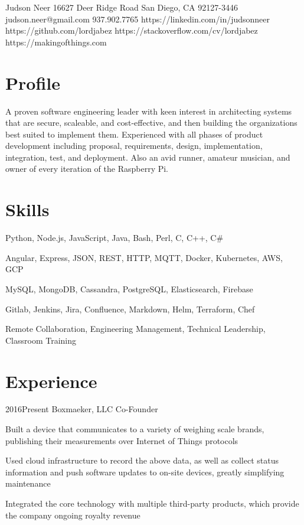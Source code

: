 \documentclass{article}
\begin{document}
\header
  {Judson Neer}
  {16627 Deer Ridge Road}
  {San Diego, CA 92127-3446}
  {judson.neer@gmail.com}
  {937.902.7765}
  {https://linkedin.com/in/judsonneer}
  {https://github.com/lordjabez}
  {https://stackoverflow.com/cv/lordjabez}
  {https://makingofthings.com}


\section{Profile}

A proven software engineering leader with keen interest in architecting systems that are secure, scaleable, and cost-effective, and then building the organizations best suited to implement them. Experienced with all phases of product development including proposal, requirements, design, implementation, integration, test, and deployment. Also an avid runner, amateur musician, and owner of every iteration of the Raspberry Pi.


\section{Skills}

  {Python, Node.js, JavaScript, Java, Bash, Perl, C, C++, C\#}

  {Angular, Express, JSON, REST, HTTP, MQTT, Docker, Kubernetes, AWS, GCP}

  {MySQL, MongoDB, Cassandra, PostgreSQL, Elasticsearch, Firebase}

  {Gitlab, Jenkins, Jira, Confluence, Markdown, Helm, Terraform, Chef}

  {Remote Collaboration, Engineering Management, Technical Leadership, Classroom Training}


\section{Experience}

\job
  {2016}{Present}
  {Boxmaeker, LLC}
  {Co-Founder}
  {\begin{achievements}
    \item Built a device that communicates to a variety of weighing scale brands, publishing their measurements over Internet of Things protocols
    \item Used cloud infrastructure to record the above data, as well as collect status information and push software updates to on-site devices, greatly simplifying maintenance
    \item Integrated the core technology with multiple third-party products, which provide the company ongoing royalty revenue
  \end{achievements}}
\end{document}
